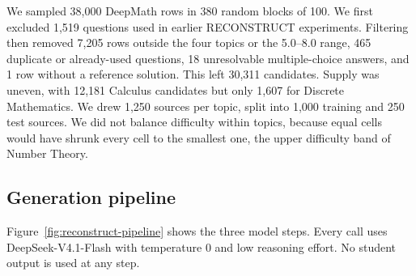 \documentclass[11pt]{article}
\begin{document}
We sampled 38,000 DeepMath rows in 380 random blocks of 100. We first excluded 1,519 questions used in earlier RECONSTRUCT experiments. Filtering then removed 7,205 rows outside the four topics or the 5.0--8.0 range, 465 duplicate or already-used questions, 18 unresolvable multiple-choice answers, and 1 row without a reference solution. This left 30,311 candidates. Supply was uneven, with 12,181 Calculus candidates but only 1,607 for Discrete Mathematics. We drew 1,250 sources per topic, split into 1,000 training and 250 test sources. We did not balance difficulty within topics, because equal cells would have shrunk every cell to the smallest one, the upper difficulty band of Number Theory.

\subsection{Generation pipeline}

Figure~\ref{fig:reconstruct-pipeline} shows the three model steps. Every call uses DeepSeek-V4.1-Flash with temperature 0 and low reasoning effort. No student output is used at any step.
\end{document}
